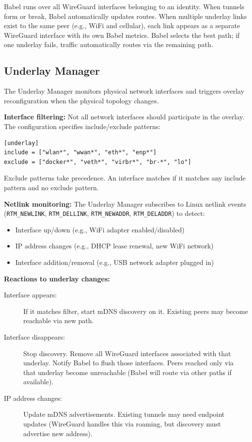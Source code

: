 Babel runs over all WireGuard interfaces belonging to an identity. When tunnels form or break, Babel automatically updates routes. When multiple underlay links exist to the same peer (e.g., WiFi and cellular), each link appears as a separate WireGuard interface with its own Babel metrics. Babel selects the best path; if one underlay fails, traffic automatically routes via the remaining path.

\subsection{Underlay Manager}

The Underlay Manager monitors physical network interfaces and triggers overlay reconfiguration when the physical topology changes.

\textbf{Interface filtering:} Not all network interfaces should participate in the overlay. The configuration specifies include/exclude patterns:

\begin{lstlisting}
[underlay]
include = ["wlan*", "wwan*", "eth*", "enp*"]
exclude = ["docker*", "veth*", "virbr*", "br-*", "lo"]
\end{lstlisting}

Exclude patterns take precedence. An interface matches if it matches any include pattern and no exclude pattern.

\textbf{Netlink monitoring:} The Underlay Manager subscribes to Linux netlink events (\texttt{RTM\_NEWLINK}, \texttt{RTM\_DELLINK}, \texttt{RTM\_NEWADDR}, \texttt{RTM\_DELADDR}) to detect:
\begin{itemize}[nosep]
    \item Interface up/down (e.g., WiFi adapter enabled/disabled)
    \item IP address changes (e.g., DHCP lease renewal, new WiFi network)
    \item Interface addition/removal (e.g., USB network adapter plugged in)
\end{itemize}

\textbf{Reactions to underlay changes:}
\begin{description}
    \item[Interface appears:] If it matches filter, start mDNS discovery on it. Existing peers may become reachable via new path.
    \item[Interface disappears:] Stop discovery. Remove all WireGuard interfaces associated with that underlay. Notify Babel to flush those interfaces. Peers reached only via that underlay become unreachable (Babel will route via other paths if available).
    \item[IP address changes:] Update mDNS advertisements. Existing tunnels may need endpoint updates (WireGuard handles this via roaming, but discovery must advertise new address).
\end{description}

